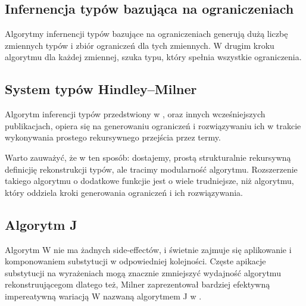 \documentclass{article}
\begin{document}
\subsection{Infernencja typów bazująca na ograniczeniach}
Algorytmy infernencji typów bazujące na ograniczeniach generują dużą liczbę zmiennych typów i zbiór ograniczeń dla tych zmiennych. W drugim kroku algorytmu dla każdej zmiennej, szuka typu, który spełnia wszystkie ograniczenia.
\subsection{System typów Hindley–Milner}
Algorytm inferencji typów przedstwiony w \cite{Milner__1978}, oraz innych wcześniejszych publikacjach, opiera się na generowaniu ograniczeń i rozwiązywaniu ich w trakcie wykonywania prostego rekursywnego przejścia przez termy.

Warto zauważyć, że w ten sposób: dostajemy, prostą strukturalnie rekursywną definicjię rekonstrukcji typów, ale tracimy modularność algorytmu. Rozszerzenie takiego algorytmu o dodatkowe funkcjie jest o wiele trudniejsze, niż algorytmu, który oddziela kroki generowania ograniczeń i ich rozwiązywania.
\newpage
\subsection{Algorytm J}
Algorytm W nie ma żadnych side-effectów, i świetnie zajmuje się aplikowanie i komponowaniem substytucji w odpowiedniej kolejności. Częste apikacje substytucji na wyrażeniach mogą znacznie zmniejszyć wydajność algorytmu rekonstruującegom dlatego też, Milner zaprezentował bardziej efektywną impereatywną wariacją W nazwaną algorytmem J w \cite{Milner__1978}.
\end{document}
